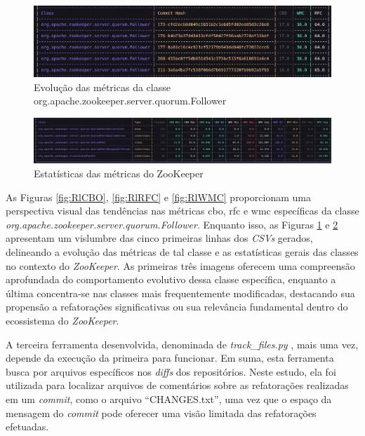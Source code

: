 \begin{figure}[h]
    \centering
    \includegraphics[width=0.8\linewidth]{figuras/Output/Metrics_Evolution/Metrics_Evolution.png}
    \caption{Evolução das métricas da classe org.apache.zookeeper.server.quorum.Follower}
    \label{fig:EvolutionFollowerClass}
\end{figure}

\begin{figure}[h]
    \centering
    \includegraphics[width=0.8\linewidth]{figuras/Output/Metrics_Statistics/Metrics_Statistics.png}
    \caption{Estatísticas das métricas do ZooKeeper}
    \label{fig:StatisticsFollowerClass}
\end{figure}

As Figuras \ref{fig:RlCBO}, \ref{fig:RlRFC} e \ref{fig:RlWMC} proporcionam uma perspectiva visual das tendências nas métricas \gls{cbo}, \gls{rfc} e \gls{wmc} específicas da classe \textit{org.apache.zookeeper.server.quorum.Follower}. Enquanto isso, as Figuras \ref{fig:EvolutionFollowerClass} e \ref{fig:StatisticsFollowerClass} apresentam um vislumbre das cinco primeiras linhas dos \textit{CSVs} gerados, delineando a evolução das métricas de tal classe e as estatísticas gerais das classes no contexto do \textit{ZooKeeper}. As primeiras três imagens oferecem uma compreensão aprofundada do comportamento evolutivo dessa classe específica, enquanto a última concentra-se nas classes mais frequentemente modificadas, destacando sua propensão a refatorações significativas ou sua relevância fundamental dentro do ecossistema do \textit{ZooKeeper}.

A terceira ferramenta desenvolvida, denominada de \textit{track\_files.py} \cite{PyDriller:TrackFiles:2023}, mais uma vez, depende da execução da primeira para funcionar. Em suma, esta ferramenta busca por arquivos específicos nos \textit{diffs} dos repositórios. Neste estudo, ela foi utilizada para localizar arquivos de comentários sobre as refatorações realizadas em um \textit{commit}, como o arquivo ``CHANGES.txt'', uma vez que o espaço da mensagem do \textit{commit} pode oferecer uma visão limitada das refatorações efetuadas.

